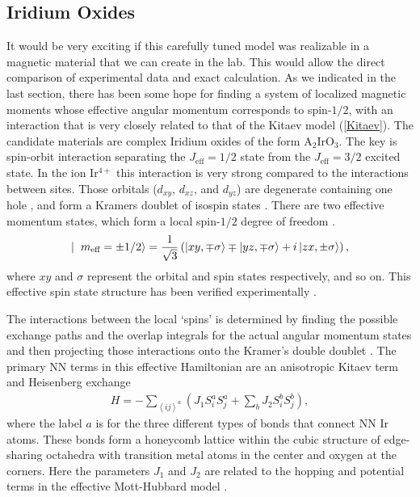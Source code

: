 \documentclass[aps,pra,preprint,groupedaddress]{revtex4-1}
\newcommand{\1}{\mathds{1}}
\begin{document}
\subsection{Iridium Oxides}

It would be very exciting if this carefully tuned model was realizable in a magnetic material that we can create in the lab. This would allow the direct comparison of experimental data and exact calculation. As we indicated in the last section, there has been some hope for finding a system of localized magnetic moments whose effective angular momentum corresponds to spin-$1/2$, with an interaction that is very closely related to that of the Kitaev model (\ref{Kitaev}). The candidate materials are complex Iridium oxides of the form A$_2$IrO$_3$. The key is spin-orbit interaction separating the $J_{\textrm{eff}} = 1/2$ state from the $J_{\textrm{eff}} = 3/2$ excited state. %
In the ion Ir$^{4+}$ this interaction is very strong compared to the interactions between sites. Those orbitals ($d_{xy}$, $d_{xz}$, and $d_{yz}$) are degenerate containing one hole \cite{Jiri}, and form a Kramers doublet of isospin states \cite{Jackeli}. There are two effective momentum states, which form a local spin-$1/2$ degree of freedom \cite{Jiri}.
\begin{align}
\ket{\hspace{.2 cm} m_{\textrm{eff}}=\pm 1/2} = \frac{1}{\sqrt{3}} \left( \ket{xy,\mp\sigma} \mp \ket{yz,\mp\sigma} + i \ket{zx,\pm\sigma} \right),
\end{align}
where $xy$ and $\sigma$ represent the orbital and spin states respectively, and so on. This effective spin state structure has been verified experimentally \cite{Kim,Jiri}.

The interactions between the local `spins' is determined by finding the possible exchange paths \cite{Jackeli} and the overlap integrals for the actual angular momentum states and then projecting those interactions onto the Kramer's double doublet \cite{Jiri}. The primary NN terms in this effective Hamiltonian are an anisotropic Kitaev term and Heisenberg exchange \cite{Jackeli}
\begin{align*}
H= -\sum_{\left<ij\right>^a} \left( J_1 S^a_i S^a_j + \sum_b J_2 S_i^b S^b_j \right) ,
\end{align*}
where the label $a$ is for the three different types of bonds that connect NN Ir atoms. %
These bonds form a honeycomb lattice within the cubic structure of edge-sharing octahedra with transition metal atoms in the center and oxygen at the corners. Here the parameters $J_1$ and $J_2$ are related to the hopping and potential terms in the effective Mott-Hubbard model \cite{Jiri}. 
\end{document}
